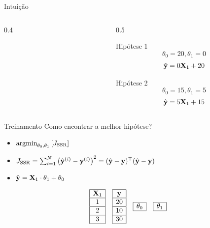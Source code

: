 \documentclass[aspectratio=169,xcolor=dvipsnames]{beamer}
\begin{document}
\begin{frame}{Intuição}
{\begin{columns}[onlytextwidth]
\begin{column}{0.4\textwidth}
        
    \end{column}
    \begin{column}{0.5\textwidth}
        \begin{block}{ Hipótese 1}
        \scriptsize
            \[ \theta_0=20, \theta_1=0\]
            \[\hat{\mathbf{y}}=0\mathbf{X}_1+20\]
        \end{block}
        \begin{block}{ Hipótese 2}
        \scriptsize
            \[ \theta_0=15, \theta_1=5\]
            \[\hat{\mathbf{y}}=5\mathbf{X}_1+15\]
        \end{block}
    \end{column}
\end{columns}
}   
\end{frame}
\normalsize
\begin{frame}{Treinamento}
Como encontrar a melhor hipótese?
\begin{itemize}
    \item\(\operatorname*{argmin}_{\theta_0,\theta_1}\left[J_{\text{SSR}}\right]\)
    \item \(J_{\text{SSR}}=\sum_{i=1}^{N}\left(\hat{\mathbf{y}}^{(i)} - \mathbf{y}^{(i)}\right)^2=(\hat{\mathbf{y}} - \mathbf{y})^\top(\hat{\mathbf{y}} - \mathbf{y})\)
    \item \(\hat{\mathbf{y}}=\mathbf{X}_1\cdot\theta_1+\theta_0\)
\end{itemize}

    \[
    \begin{array}{|c|}
      \hline
        \mathbf{X}_1  \\
        \hline
        1   \\
        \hline
        2   \\
        \hline
        3   \\
        \hline
      \end{array}
      \quad
      \begin{array}{|c|}
      \hline
        \mathbf{y}  \\
        \hline
        20   \\
        \hline
        10   \\
        \hline
        30   \\
        \hline
      \end{array}
      \quad
      \begin{array}{|c|}
      \hline
        \theta_0  \\
        \hline
      \end{array}
      \quad
      \begin{array}{|c|}
      \hline
        \theta_1  \\
        \hline
      \end{array}
    \]
\end{frame}
\end{document}
